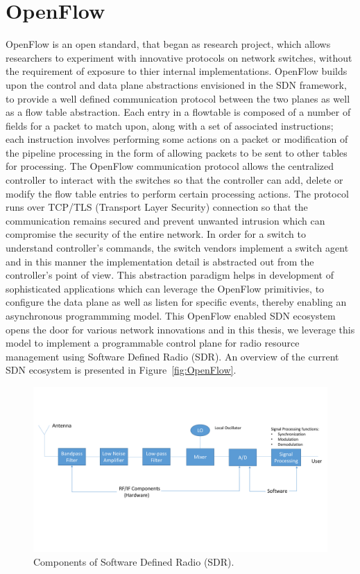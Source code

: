 \section{OpenFlow}
OpenFlow is an open standard, that began as research project, which allows researchers to experiment with innovative protocols on network switches, without the requirement of exposure to thier internal implementations. OpenFlow\cite{openflow} builds upon the control and data plane abstractions envisioned in the SDN framework, to provide a well defined communication protocol between the two planes as well as a flow table abstraction. Each entry in a flowtable is composed of a number of fields for a packet to match upon, along with a set of associated instructions; each instruction involves performing some actions on a packet or modification of the pipeline processing in the form of allowing packets to be sent to other tables for processing. The OpenFlow communication protocol allows the centralized controller to interact with the switches so that the controller can add, delete or modify the flow table entries to perform certain processing actions. The protocol runs over TCP/TLS (Transport Layer Security) connection so that the communication remains secured and prevent unwanted intrusion which can compromise the security of the entire network. In order for a switch to understand controller's commands, the switch vendors implement a switch agent and in this manner the implementation detail is abstracted out from the controller's point of view. This abstraction paradigm helps in development of sophisticated applications which can leverage the OpenFlow primitivies, to configure the data plane as well as listen for specific events, thereby enabling an asynchronous programmming model. This OpenFlow enabled SDN ecosystem opens the door for various network innovations and in this thesis, we leverage this model to implement a programmable control plane for radio resource management using Software Defined Radio (SDR). An overview of the current SDN ecosystem is presented in Figure~\ref{fig:OpenFlow}.     


\begin{figure}[t]
  \centering
  \includegraphics[width=1\textwidth]{figures/SDR.pdf}
  \caption{Components of Software Defined Radio (SDR).}
  \label{fig:SDR}
\end{figure}

